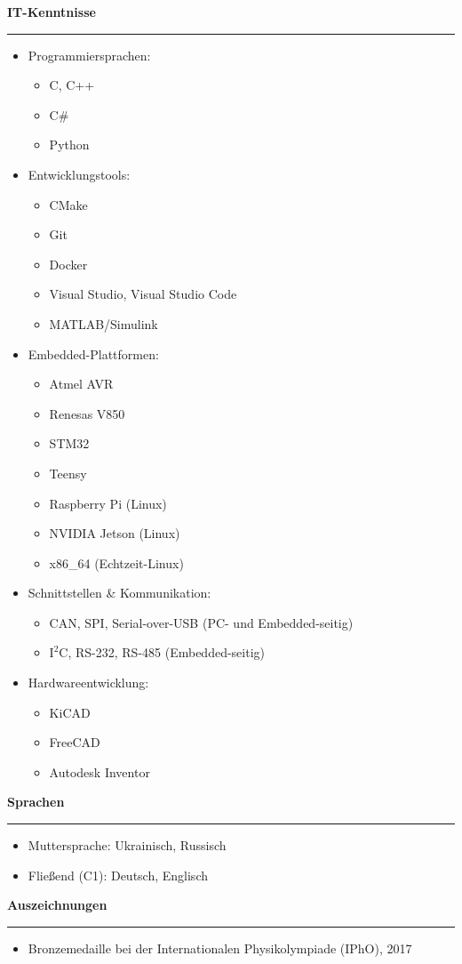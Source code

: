 \documentclass[12pt]{article} %
\newcommand{\HighlightedText}[1] {{\textbf{#1}}}
\newenvironment{ItemizeSection}[1]{
    \vspace{1mm}
    \HighlightedText{#1}
    \vspace{0.5mm}
    {\color{custom_blue} \hrule}
    \begin{itemize}[left=0.5em, topsep=0pt, itemsep=0pt, label={$\bullet$}]
}{
    \end{itemize}
}
\newenvironment{ItemizeSubsection}{
    \begin{itemize}[left=0.5em, topsep=-999pt, itemsep=0pt, label={$\circ$}]
}{
    \end{itemize}
}
\begin{document}
\newpage
\begin{ItemizeSection}{IT-Kenntnisse}
\item Programmiersprachen:
    \begin{ItemizeSubsection}
        \item C, C++
        \item C\#
        \item Python
    \end{ItemizeSubsection}
    \item Entwicklungstools:
    \begin{ItemizeSubsection}
        \item CMake
        \item Git
        \item Docker
        \item Visual Studio, Visual Studio Code
        \item MATLAB/Simulink
    \end{ItemizeSubsection}
    \item Embedded-Plattformen:
    \begin{ItemizeSubsection}
        \item Atmel AVR
        \item Renesas V850
        \item STM32
        \item Teensy
        \item Raspberry Pi (Linux)
        \item NVIDIA Jetson (Linux)
        \item x86\_64 (Echtzeit-Linux)
    \end{ItemizeSubsection}
    \item Schnittstellen \& Kommunikation:
    \begin{ItemizeSubsection}
        \item CAN, SPI, Serial-over-USB (PC- und Embedded-seitig)
        \item $\mathrm{I^2C}$, RS-232, RS-485 (Embedded-seitig)
    \end{ItemizeSubsection}
    \item Hardwareentwicklung:
    \begin{ItemizeSubsection}
        \item KiCAD
        \item FreeCAD
        \item Autodesk Inventor
    \end{ItemizeSubsection}
\end{ItemizeSection}

\begin{ItemizeSection}{Sprachen}
    \item Muttersprache: Ukrainisch, Russisch
    \item Fließend (C1): Deutsch, Englisch
\end{ItemizeSection}

\begin{ItemizeSection}{Auszeichnungen}
    \item Bronzemedaille bei der Internationalen Physikolympiade (IPhO), 2017
\end{ItemizeSection}
\end{document}
